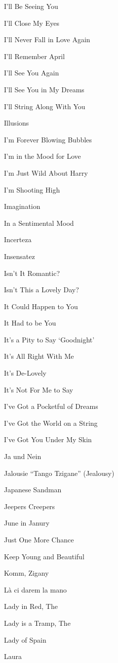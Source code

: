\N I'll Be Seeing You


\N I'll Close My Eyes


\N I'll Never Fall in Love Again


\N I'll Remember April


\N I'll See You Again


\N I'll See You in My Dreams


\N I'll String Along With You


\N Illusions


\N I'm Forever Blowing Bubbles


\N I'm in the Mood for Love


\N I'm Just Wild About Harry


\N I'm Shooting High


\N Imagination


\N In a Sentimental Mood


\N Incerteza


\N Insensatez


\N Isn't It Romantic?


\N Isn't This a Lovely Day?


\N It Could Happen to You


\N It Had to be You


\N It's a Pity to Say `Goodnight'


\N It's All Right With Me


\N It's De-Lovely


\N It's Not For Me to Say


\N I've Got a Pocketful of Dreams


\N I've Got the World on a String


\N I've Got You Under My Skin


\N Ja und Nein


\N Jalousie ``Tango Tzigane'' (Jealousy)


\N Japanese Sandman


\N Jeepers Creepers


\N June in Janury


\N Just One More Chance


\N Keep Young and Beautiful


\N Komm, Zigany


\N L{\`a} ci darem la mano


\N Lady in Red, The


\N Lady is a Tramp, The


\N Lady of Spain


\N Laura



